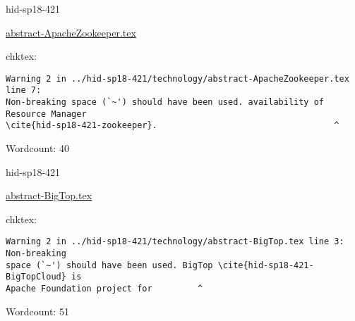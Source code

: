 

\begin{IU}

hid-sp18-421

\href{https://github.com/cloudmesh-community/hid-sp18-421/blob/master//technology/abstract-ApacheZookeeper.tex}{abstract-ApacheZookeeper.tex}

 
chktex:
\begin{tiny}
\begin{verbatim}
Warning 2 in ../hid-sp18-421/technology/abstract-ApacheZookeeper.tex line 7:
Non-breaking space (`~') should have been used. availability of Resource Manager
\cite{hid-sp18-421-zookeeper}.                                   ^
\end{verbatim}
\end{tiny}

Wordcount: 40

\end{IU}



\begin{IU}

hid-sp18-421

\href{https://github.com/cloudmesh-community/hid-sp18-421/blob/master//technology/abstract-BigTop.tex}{abstract-BigTop.tex}

 
chktex:
\begin{tiny}
\begin{verbatim}
Warning 2 in ../hid-sp18-421/technology/abstract-BigTop.tex line 3: Non-breaking
space (`~') should have been used. BigTop \cite{hid-sp18-421-BigTopCloud} is
Apache Foundation project for         ^
\end{verbatim}
\end{tiny}

Wordcount: 51

\end{IU}



